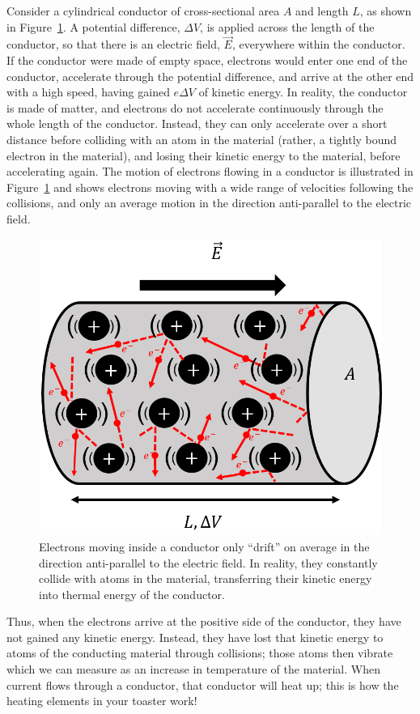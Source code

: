 Consider a cylindrical conductor of cross-sectional area $A$ and length $L$, as shown in Figure~\ref{fig:current:collisions}. A potential difference, $\Delta V$, is applied across the length of the conductor, so that there is an electric field, $\vec E$, everywhere within the conductor. If the conductor were made of empty space, electrons would enter one end of the conductor, accelerate through the potential difference, and arrive at the other end with a high speed, having gained $e\Delta V$ of kinetic energy. In reality, the conductor is made of matter, and electrons do not accelerate continuously through the whole length of the conductor. Instead, they can only accelerate over a short distance before colliding with an atom in the material (rather, a tightly bound electron in the material), and losing their kinetic energy to the material, before accelerating again. The motion of electrons flowing in a conductor is illustrated in Figure~\ref{fig:current:collisions} and shows electrons moving with a wide range of velocities following the collisions, and only an average motion in the direction anti-parallel to the electric field.

\begin{figure}[!htbp]
\centering
\includegraphics[width=0.4\linewidth]{files/collisions-bb5c391e996427814e4a857ff6bd18f5.png}
\caption[]{Electrons moving inside a conductor only ``drift'' on average in the direction anti-parallel to the electric field. In reality, they constantly collide with atoms in the material, transferring their kinetic energy into thermal energy of the conductor.}
\label{fig:current:collisions}
\end{figure}

Thus, when the electrons arrive at the positive side of the conductor, they have not gained any kinetic energy. Instead, they have lost that kinetic energy to atoms of the conducting material through collisions; those atoms then vibrate which we can measure as an increase in temperature of the material. When current flows through a conductor, that conductor will heat up; this is how the heating elements in your toaster work!

